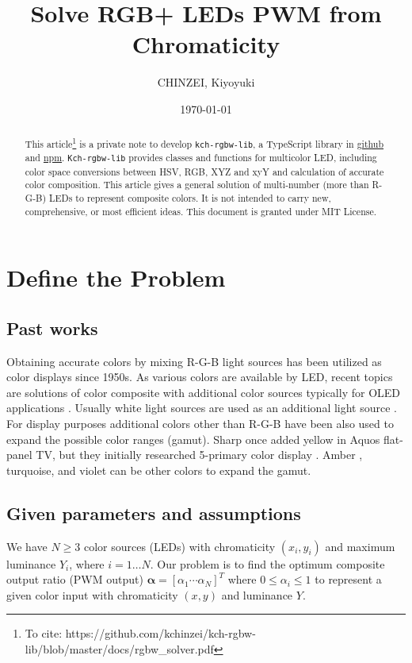 \documentclass[dvipdfmx,a4paper]{article}
\title{Solve RGB+ LEDs PWM from Chromaticity}
\author{CHINZEI, Kiyoyuki}
\date{\today}
\begin{document}
\maketitle

\begin{abstract}
This article\footnote{To cite: https://github.com/kchinzei/kch-rgbw-lib/blob/master/docs/rgbw\_solver.pdf} is a private note to develop \texttt{kch-rgbw-lib}, a TypeScript library in \href{https://github.com/kchinzei/kch-rgbw-lib}{github} and \href{https://www.npmjs.com/package/kch-rgbw-lib}{npm}. \texttt{Kch-rgbw-lib} provides classes and functions for multicolor LED, including color space conversions between HSV, RGB, XYZ and xyY and calculation of accurate color composition. This article gives a general solution of multi-number (more than R-G-B) LEDs to represent composite colors. It is not intended to carry new, comprehensive, or most efficient ideas. This document is granted under MIT License.
\end{abstract}

\section{Define the Problem}
\subsection{Past works}\label{s_intro}
Obtaining accurate colors by mixing R-G-B light sources has been utilized as color displays since 1950s. As various colors are available by LED, recent topics are solutions of color composite with additional color sources typically for OLED applications \cite{Chi2011, Lee2014}. Usually white light sources are used as an additional light source \cite{AN1562, Chi2011, Lee2014}. For display purposes additional colors other than R-G-B have been also used to expand the possible color ranges (gamut)\cite{Wikipedia_multicolor}. Sharp once added yellow in Aquos flat-panel TV, but they initially researched 5-primary color display \cite{Sharp2011}. Amber \cite{AN2026}, turquoise, and violet can be other colors to expand the gamut.

\subsection{Given parameters and assumptions}\label{s_assumptions}
We have $N \geq 3$ color sources (LEDs) with chromaticity $(x_i, y_i)$ and maximum luminance $Y_i$, where $i=1 \ldots N$. Our problem is to find the optimum composite output ratio (PWM output) $\boldsymbol{\alpha} = [\alpha_1 \cdots \alpha_N]^T$ where $0 \leq \alpha_i \leq 1$ to represent a given color input with chromaticity $(x, y)$ and luminance $Y$.
\end{document}
